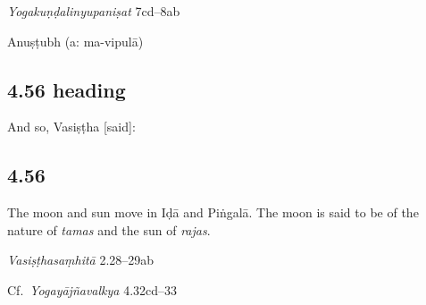 \begin{ekdosis}
\begin{testimonia}[hp04_055]
\emph{Yogakuṇḍalinyupaniṣat} 7cd–8ab
\begin{versinnote}
\end{versinnote}
\end{testimonia}


\begin{metre}[hp04_055]
Anuṣṭubh (a: ma-vipulā)
\end{metre}

\subsection*{4.56 heading}
\begin{translation}[hp04_056a]
And so, Vasiṣṭha [said]:
\end{translation}


\subsection*{4.56}
\begin{translation}[hp04_056]
The moon and sun move in Iḍā and Piṅgalā. The moon is said to be of the nature of \emph{tamas} and the sun of \emph{rajas}.
\end{translation}

\begin{sources}[hp04_056]
\emph{Vasiṣṭhasaṃhitā} 2.28–29ab
\begin{versinnote}
\end{versinnote}

Cf.~\emph{Yogayājñavalkya} 4.32cd–33
\begin{versinnote}
\end{versinnote}


\end{sources}
\end{ekdosis}
